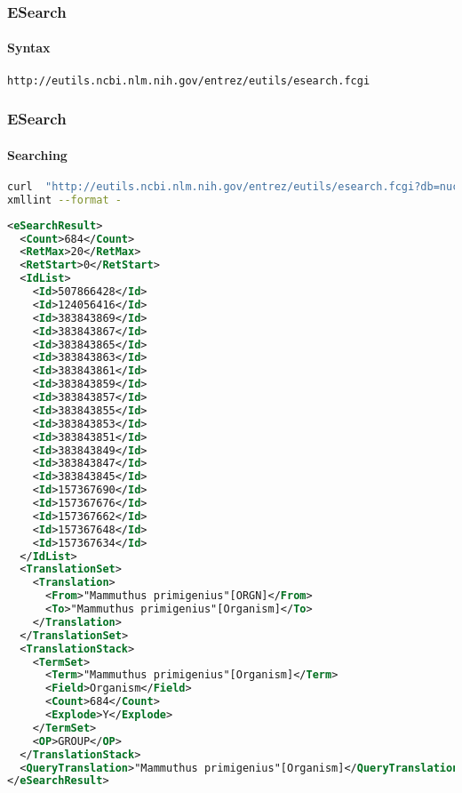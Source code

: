 \documentclass{beamer}
\begin{document}
\begin{frame}[fragile]
\frametitle{ESearch}
\framesubtitle{Syntax}
\begin{lstlisting}
http://eutils.ncbi.nlm.nih.gov/entrez/eutils/esearch.fcgi
\end{lstlisting}
\end{frame}

\begin{frame}[fragile]
\frametitle{ESearch}
\framesubtitle{Searching }
\begin{lstlisting}[language=bash,basicstyle=\tiny,breaklines=true]
curl  "http://eutils.ncbi.nlm.nih.gov/entrez/eutils/esearch.fcgi?db=nucleotide&term=%22Mammuthus%20primigenius%22%5BORGN%5D" |\
xmllint --format -
\end{lstlisting}

\begin{lstlisting}[language=xml,basicstyle=\tiny,breaklines=false]
<eSearchResult>
  <Count>684</Count>
  <RetMax>20</RetMax>
  <RetStart>0</RetStart>
  <IdList>
    <Id>507866428</Id>
    <Id>124056416</Id>
    <Id>383843869</Id>
    <Id>383843867</Id>
    <Id>383843865</Id>
    <Id>383843863</Id>
    <Id>383843861</Id>
    <Id>383843859</Id>
    <Id>383843857</Id>
    <Id>383843855</Id>
    <Id>383843853</Id>
    <Id>383843851</Id>
    <Id>383843849</Id>
    <Id>383843847</Id>
    <Id>383843845</Id>
    <Id>157367690</Id>
    <Id>157367676</Id>
    <Id>157367662</Id>
    <Id>157367648</Id>
    <Id>157367634</Id>
  </IdList>
  <TranslationSet>
    <Translation>
      <From>"Mammuthus primigenius"[ORGN]</From>
      <To>"Mammuthus primigenius"[Organism]</To>
    </Translation>
  </TranslationSet>
  <TranslationStack>
    <TermSet>
      <Term>"Mammuthus primigenius"[Organism]</Term>
      <Field>Organism</Field>
      <Count>684</Count>
      <Explode>Y</Explode>
    </TermSet>
    <OP>GROUP</OP>
  </TranslationStack>
  <QueryTranslation>"Mammuthus primigenius"[Organism]</QueryTranslation>
</eSearchResult>
\end{lstlisting}
\end{frame}
\end{document}

